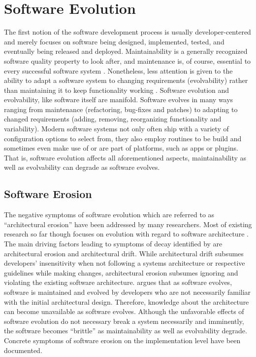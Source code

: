 \section{Software Evolution} \label{sec:evolving_solftware}
The first notion of the software development process is usually
developer-centered and merely focuses on software being designed, implemented,
tested, and eventually being released and deployed.
Maintainability is a generally recognized software quality
property to look after, and maintenance is, of course, essential to every
successful software system \cite{liggesmeyer_software-qualitat:_2009}. Nonetheless, less attention is given to
the ability to adapt a software system to changing requirements (evolvability) rather than maintaining it to keep functionality
working \citep{parnas_software_1994}. Software evolution and evolvability, like
software itself are manifold. Software evolves in many ways ranging from maintenance (refactoring,
bug-fixes and patches) to adapting to changed requirements (adding, removing,
reorganizing functionality and variability).
Modern software systems not only often ship with a variety of configuration
options to select from, they also employ routines to be build and sometimes even
make use of or are part of platforms, such as apps or plugins. That is,
software evolution affects all aforementioned aspects, maintainability as
well as evolvability can degrade as software evolves.

\subsection{Software Erosion}
The negative symptoms of software evolution which are referred to as
``architectural erosion'' \citep{breivold_systematic_2012} have
been addressed by many researchers.
Most of existing research so far though focuses on evolution with regard to
software architecture \citep{breivold_systematic_2012}. The main driving factors leading to symptoms of decay
identified by \cite{perry_software_1991} are architectural erosion and
architectural drift. While architectural drift subsumes developers'
insensitivity when not following a systems architecture or respective guidelines while making changes, architectural erosion subsumes ignoring and violating the existing software
architecture. \cite{parnas_software_1994} argues that as software evolves, software is maintained
and evolved by developers who are not necessarily familiar with the initial
architectural design. Therefore, knowledge about the architecture can become
unavailable as software evolves. Although the unfavorable effects of software
evolution do not necessary break a system necessarily and imminently, the software becomes ``brittle'' \citep{perry_software_1991}
as maintainability as well as evolvability degrade. Concrete  symptoms of software
erosion on the implementation level have been documented. 


